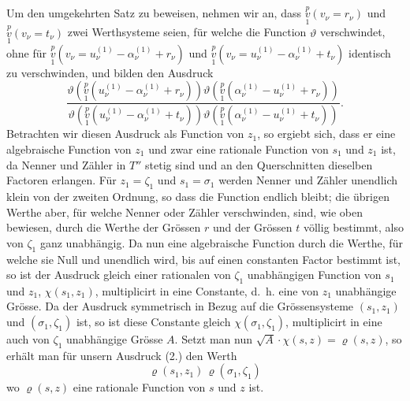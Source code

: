 \documentclass{article}
\begin{document}
Um den umgekehrten Satz zu beweisen, nehmen wir an, dass $\overset{p}{\underset{1}{v}}(v_\nu = r_\nu)$ und $\overset{p}{\underset{1}{v}}(v_\nu = t_\nu)$ zwei Werthsysteme seien, für welche die Function $\vartheta$ verschwindet, ohne für $\overset{p}{\underset{1}{v}}(v_\nu = u_\nu^{(1)} - \alpha_\nu^{(1)} + r_\nu)$ und $\overset{p}{\underset{1}{v}}(v_\nu = u_\nu^{(1)} - \alpha_\nu^{(1)} + t_\nu)$ identisch zu verschwinden, und bilden den Ausdruck
\[
\tag{(2.)}
\frac{\vartheta\left(\overset{p}{\underset{1}{v}}(u_\nu^{(1)} - \alpha_\nu^{(1)} + r_\nu)\right)\vartheta\left(\overset{p}{\underset{1}{v}}(\alpha_\nu^{(1)} - u_\nu^{(1)} + r_\nu)\right)}{\vartheta\left(\overset{p}{\underset{1}{v}}(u_\nu^{(1)} - \alpha_\nu^{(1)} + t_\nu)\right)\vartheta\left(\overset{p}{\underset{1}{v}}(\alpha_\nu^{(1)} - u_\nu^{(1)} + t_\nu)\right)}.
\]
Betrachten wir diesen Ausdruck als Function von $z_1$, so ergiebt sich, dass er eine algebraische Function von $z_1$ und zwar eine rationale Function von $s_1$ und $z_1$ ist, da Nenner und Zähler in $T''$ stetig sind und an den Querschnitten dieselben Factoren erlangen. Für $z_1 = \zeta_1$ und $s_1 = \sigma_1$ werden Nenner und Zähler unendlich klein von der zweiten Ordnung, so dass die Function endlich bleibt; die übrigen Werthe aber, für welche Nenner oder Zähler verschwinden, sind, wie oben bewiesen, durch die Werthe der Grössen $r$ und der Grössen $t$ völlig bestimmt, also von $\zeta_1$ ganz unabhängig. Da nun eine algebraische Function durch die Werthe, für welche sie Null und unendlich wird, bis auf einen
constanten Factor bestimmt ist, so ist der Ausdruck gleich einer rationalen von $\zeta_1$ unabhängigen Function von $s_1$ und $z_1$, $\chi(s_1, z_1)$, multiplicirt in eine Constante, d.~h. eine von $z_1$ unabhängige Grösse. Da der Ausdruck symmetrisch in Bezug auf die Grössensysteme $(s_1, z_1)$ und $(\sigma_1, \zeta_1)$ ist, so ist diese Constante gleich $\chi(\sigma_1, \zeta_1)$, multiplicirt in eine auch von $\zeta_1$ unabhängige Grösse $A$. Setzt man nun $\sqrt{A}\cdot\chi(s, z) = \varrho(s, z)$, so erhält man für unsern Ausdruck (2.) den Werth
\[
\tag{(3.)}
\varrho(s_1, z_1)\,\varrho(\sigma_1, \zeta_1)
\]
wo $\varrho(s, z)$ eine rationale Function von $s$ und $z$ ist.
\end{document}
